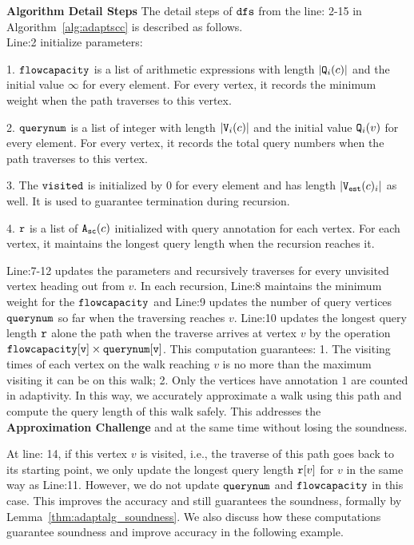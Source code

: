 \textbf{Algorithm Detail Steps}
The detail steps of $\mathtt{dfs}$
from the line: 2-15 in Algorithm~\ref{alg:adaptscc}
is described as follows.
 \\
Line:2 initialize parameters:

1. 
 $\mathtt{flowcapacity}$ is a list of arithmetic expressions with length $|\mathtt{Q}_i(c)|$ and the initial value $\infty$ for every element. For every vertex, it records the minimum weight when the path traverses to this vertex.

2. $\mathtt{querynum}$ is a list of integer with length $|\mathtt{V}_i(c)|$ and the initial value $\mathtt{Q}_i(v)$ for every element. 
For every vertex, 
it records the total query numbers when the path traverses to this vertex.

3. The $\mathtt{visited}$ is initialized by $0$ for every element and has length $|\mathtt{{V_{est}}}(c)_i|$ as well. It is used to guarantee termination during recursion.

4. $\mathtt{r}$ is a list of ${\mathtt{A_{sc}}}(c)$ initialized with query annotation for each vertex. For each vertex, it maintains the longest query length when the recursion reaches it.

Line:7-12 updates the parameters and recursively traverses for every unvisited vertex heading out from $v$.
In each recursion,
Line:8 maintains the minimum weight for the 
$\mathtt{flowcapacity}$ and Line:9 updates the 
number of query vertices 
$\mathtt{querynum}$ so far when the traversing reaches $v$.
Line:10
updates the longest query length $\mathtt{r}$
alone the path when the traverse arrives at vertex $v$ by the operation 
$\mathtt{flowcapacity[v] \times querynum[v]}$.
This computation guarantees: 
1. The visiting times of each vertex on the walk reaching $v$ is no more than 
the maximum visiting it can be on this walk;
2. Only the vertices have annotation $1$ are counted in adaptivity.
In this way, we accurately approximate a walk using this path and compute the query length of this walk safely.
This addresses the \textbf{Approximation Challenge} and at the same time without losing the soundness.

At line: 14, if this vertex $v$ is visited, 
i.e., the traverse of this path goes back to its starting point,
we only update the longest query length $\mathtt{r}[v]$ for $v$ in the same way as Line:11.
However, we do not update
$\mathtt{querynum}$ and $\mathtt{flowcapacity}$ in this case.
This improves the accuracy and still guarantees the soundness, formally by Lemma~\ref{thm:adaptalg_soundness}. We also discuss how these computations guarantee soundness and improve accuracy in the following example.

